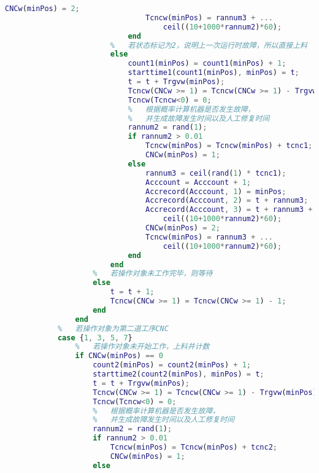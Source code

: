 \documentclass[no-math,withoutpreface,bwprint]{cumcmthesis} %
\numberwithin{equation}{section}
\numberwithin{figure}{section}
\numberwithin{table}{section}
\begin{document}
\begin{lstlisting}[language=matlab]
                                CNCw(minPos) = 2;
                                Tcncw(minPos) = rannum3 + ...
                                    ceil((10+1000*rannum2)*60);
                            end
                        %   若状态标记为2，说明上一次运行时故障，所以直接上料
                        else
                            count1(minPos) = count1(minPos) + 1;
                            starttime1(count1(minPos), minPos) = t;
                            t = t + Trgvw(minPos);
                            Tcncw(CNCw >= 1) = Tcncw(CNCw >= 1) - Trgvw(minPos);
                            Tcncw(Tcncw<0) = 0;
                            %   根据概率计算机器是否发生故障，
                            %   并生成故障发生时间以及人工修复时间
                            rannum2 = rand(1);
                            if rannum2 > 0.01
                                Tcncw(minPos) = Tcncw(minPos) + tcnc1;
                                CNCw(minPos) = 1;
                            else
                                rannum3 = ceil(rand(1) * tcnc1);
                                Acccount = Acccount + 1;
                                Accrecord(Acccount, 1) = minPos;
                                Accrecord(Acccount, 2) = t + rannum3;
                                Accrecord(Acccount, 3) = t + rannum3 + ...
                                    ceil((10+1000*rannum2)*60);
                                CNCw(minPos) = 2;
                                Tcncw(minPos) = rannum3 + ...
                                    ceil((10+1000*rannum2)*60);
                            end
                        end
                    %   若操作对象未工作完毕，则等待
                    else
                        t = t + 1;
                        Tcncw(CNCw >= 1) = Tcncw(CNCw >= 1) - 1;
                    end
                end
            %   若操作对象为第二道工序CNC
            case {1, 3, 5, 7}
                %   若操作对象未开始工作，上料并计数
                if CNCw(minPos) == 0
                    count2(minPos) = count2(minPos) + 1;
                    starttime2(count2(minPos), minPos) = t;
                    t = t + Trgvw(minPos);
                    Tcncw(CNCw >= 1) = Tcncw(CNCw >= 1) - Trgvw(minPos);
                    Tcncw(Tcncw<0) = 0;
                    %   根据概率计算机器是否发生故障，
                    %   并生成故障发生时间以及人工修复时间
                    rannum2 = rand(1);
                    if rannum2 > 0.01
                        Tcncw(minPos) = Tcncw(minPos) + tcnc2;
                        CNCw(minPos) = 1;
                    else

\end{lstlisting}
\end{document}
